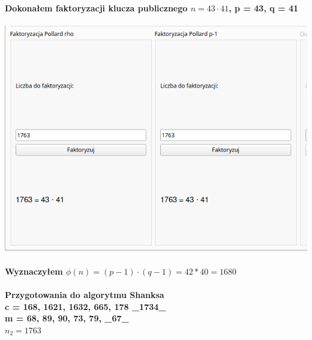 \documentclass{article}[12pt]
\begin{document}
\paragraph{Dokonałem faktoryzacji klucza publicznego $n = 43 \cdot 41$, p = 43, q = 41}
\includegraphics[width=1\textwidth]{ten.png}
\paragraph{Wyznaczyłem $\phi(n) = (p-1) \cdot (q-1) = 42 * 40 = 1680$}
\paragraph{Przygotowania do algorytmu Shanksa \\ c = 168, 1621, 1632, 665, 178 \_1734\_ \\  m = 68, 89, 90, 73, 79, \_67\_ \\  $n_2 = 1763$}
\end{document}
